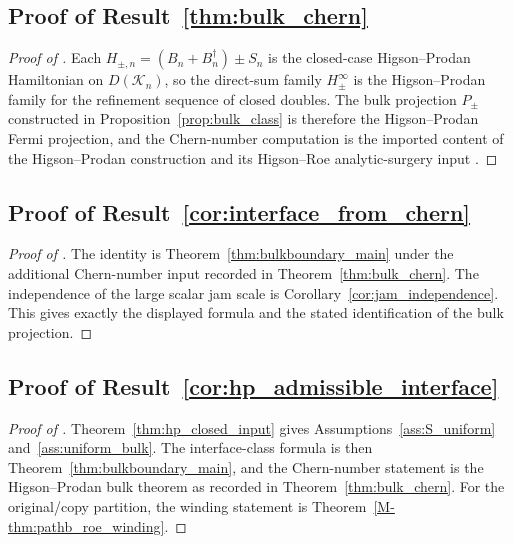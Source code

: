 \documentclass[11pt]{article}
\numberwithin{equation}{section}
\theoremstyle{definition}
\theoremstyle{remark}
\newcommand{\K}{\mathcal{K}}
\begin{document}
\subsection{Proof of Result~\ref{thm:bulk_chern}}\label{app:proof:thm:bulk_chern}
\begin{proof}[Proof of ]
Each $H_{\pm,n}=(B_n+B_n^\dagger)\pm S_n$ is the closed-case Higson--Prodan Hamiltonian on $D(\K_n)$,
so the direct-sum family $H_\pm^\infty$ is the Higson--Prodan family for the refinement sequence of
closed doubles. The bulk projection $P_\pm$ constructed in Proposition~\ref{prop:bulk_class} is
therefore the Higson--Prodan Fermi projection, and the Chern-number computation is the imported
content of the Higson--Prodan construction and its Higson--Roe analytic-surgery input
\cite{HigsonProdanUniversalPRL,HigsonProdanUniversalArxiv,HigsonRoeI,HigsonRoeII,HigsonRoeIII}.
\end{proof}

\subsection{Proof of Result~\ref{cor:interface_from_chern}}\label{app:proof:cor:interface_from_chern}
\begin{proof}[Proof of ]
The identity is Theorem~\ref{thm:bulkboundary_main} under the additional Chern-number input
recorded in Theorem~\ref{thm:bulk_chern}. The independence of the large scalar jam scale is
Corollary~\ref{cor:jam_independence}. This gives exactly the displayed formula and the stated
identification of the bulk projection.
\end{proof}

\subsection{Proof of Result~\ref{cor:hp_admissible_interface}}\label{app:proof:cor:hp_admissible_interface}
\begin{proof}[Proof of ]
Theorem~\ref{thm:hp_closed_input} gives Assumptions~\ref{ass:S_uniform}
and~\ref{ass:uniform_bulk}. The interface-class formula is then
Theorem~\ref{thm:bulkboundary_main}, and the Chern-number statement is the Higson--Prodan bulk
theorem as recorded in Theorem~\ref{thm:bulk_chern}. For the original/copy partition, the winding
statement is Theorem~\ref{M-thm:pathb_roe_winding}.
\end{proof}
\end{document}
